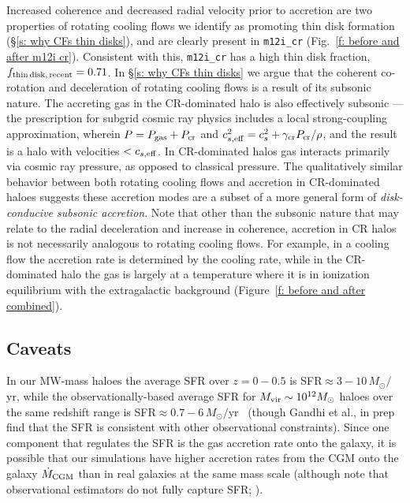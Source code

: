 \documentclass[fleqn,usenatbib]{mnras}
\newcommand{\fthin}{f_{\rm thin\,disk,\,recent}}
\newcommand{\Mdot}{\dot{M}}
\begin{document}
Increased coherence and decreased radial velocity prior to accretion are two properties of rotating cooling flows we identify as promoting thin disk formation (\S\ref{s: why CFs thin disks}), and are clearly present in \texttt{m12i\_cr} (Fig.~\ref{f: before and after m12i cr}).
Consistent with this, \texttt{m12i\_cr} has a high thin disk fraction, $\fthin=0.71$.
In \S\ref{s: why CFs thin disks} we argue that the coherent co-rotation and deceleration of rotating cooling flows is a result of its subsonic nature.
The accreting gas in the CR-dominated halo is also effectively subsonic --- the prescription for subgrid cosmic ray physics includes a local strong-coupling approximation, wherein $P = P_{\rm gas} + P_{\rm cr}$ and $c^2_{s,{\rm eff}}=c^2_{s}+\gamma_{\rm cr} P_{\rm cr}/\rho$, and the result is a halo with velocities $< c_{s,{\rm eff}}$.
In CR-dominated halos gas interacts primarily via cosmic ray pressure, as opposed to classical pressure.
The qualitatively similar behavior between both rotating cooling flows and accretion in CR-dominated haloes suggests these accretion modes are a subset of a more general form of \textit{disk-conducive subsonic accretion}.
Note that other than the subsonic nature that may relate to the radial deceleration and increase in coherence, accretion in CR halos is not necessarily analogous to rotating cooling flows.
For example, in a cooling flow the accretion rate is determined by the cooling rate, while in the CR-dominated halo the gas is largely at a temperature where it is in ionization equilibrium with the extragalactic background (Figure~\ref{f: before and after combined}).

\subsection{Caveats}
\label{s: caveats}

In our MW-mass haloes the average SFR over $z=0-0.5$ is SFR$\approx 3-10\,M_\odot/$yr, while the observationally-based average SFR for $M_{\rm vir} \sim 10^{12} M_\odot$ haloes over the same redshift range is SFR$\approx 0.7-6\,M_\odot/$yr~\citep{Behroozi2013} (though Gandhi et al., in prep find that the SFR is consistent with other observational constraints).
Since one component that regulates the SFR is the gas accretion rate onto the galaxy, it is possible that our simulations have higher accretion rates from the CGM onto the galaxy $\Mdot_{\rm CGM}$ than in real galaxies at the same mass scale (although note that observational estimators do not fully capture SFR; \citealt{FloresVelazquez2021}).
\end{document}
